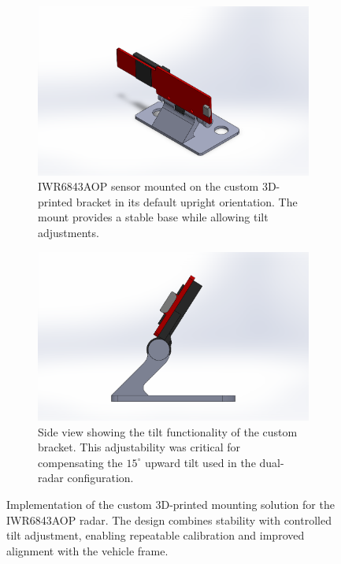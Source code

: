\begin{figure}[!htbp]
    \centering
    \begin{subfigure}[t]{0.48\linewidth}
        \centering
        \includegraphics[width=\linewidth]{images/3DModelFullSensor.png}
        \caption{IWR6843AOP sensor mounted on the custom 3D-printed bracket in its default upright orientation. 
        The mount provides a stable base while allowing tilt adjustments.}
        \label{fig:IWR6843AOP_3D_mount}
    \end{subfigure}
    \hfill
    \begin{subfigure}[t]{0.48\linewidth}
        \centering
        \includegraphics[width=\linewidth]{images/3DModelFullSensorSideTilt.png}
        \caption{Side view showing the tilt functionality of the custom bracket. 
        This adjustability was critical for compensating the $15^\circ$ upward tilt used in the dual-radar configuration.}
        \label{fig:IWR6843AOP_3D_mount_tilt}
    \end{subfigure}
    \caption{Implementation of the custom 3D-printed mounting solution for the IWR6843AOP radar. 
    The design combines stability with controlled tilt adjustment, enabling repeatable calibration and improved alignment with the vehicle frame.}
    \label{fig:IWR6843AOP_3D_mounts}
\end{figure}

